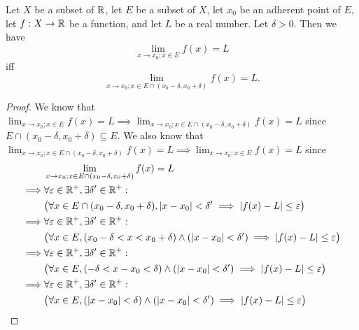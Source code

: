 \begin{prop}\label{i:9.3.18}
  Let \(X\) be a subset of \(\mathbb{R}\), let \(E\) be a subset of \(X\), let \(x_0\) be an adherent point of \(E\), let \(f : X \to \mathbb{R}\) be a function, and let \(L\) be a real number.
  Let \(\delta > 0\).
  Then we have
  \[
    \lim_{x \to x_0 ; x \in E} f(x) = L
  \]
  iff
  \[
    \lim_{x \to x_0 ; x \in E \cap (x_0 - \delta, x_0 + \delta)} f(x) = L.
  \]
\end{prop}

\begin{proof}
  We know that \(\lim_{x \to x_0 ; x \in E} f(x) = L \implies \lim_{x \to x_0 ; x \in E \cap (x_0 - \delta, x_0 + \delta)} f(x) = L\) since \(E \cap (x_0 - \delta, x_0 + \delta) \subseteq E\).
  We also know that \(\lim_{x \to x_0 ; x \in E \cap (x_0 - \delta, x_0 + \delta)} f(x) = L \implies \lim_{x \to x_0 ; x \in E} f(x) = L\) since
  \begin{align*}
             & \lim_{x \to x_0 ; x \in E \cap (x_0 - \delta, x_0 + \delta)} f(x) = L                                                                 \\
    \implies & \forall \varepsilon \in \R^+, \exists \delta' \in \R^+ :                                                                              \\
             & \big(\forall x \in E \cap (x_0 - \delta, x_0 + \delta), \abs{x - x_0} < \delta' \implies \abs{f(x) - L} \leq \varepsilon\big)         \\
    \implies & \forall \varepsilon \in \R^+, \exists \delta' \in \R^+ :                                                                              \\
             & \big(\forall x \in E, (x_0 - \delta < x < x_0 + \delta) \land (\abs{x - x_0} < \delta') \implies \abs{f(x) - L} \leq \varepsilon\big) \\
    \implies & \forall \varepsilon \in \R^+, \exists \delta' \in \R^+ :                                                                              \\
             & \big(\forall x \in E, (-\delta < x - x_0 < \delta) \land (\abs{x - x_0} < \delta') \implies \abs{f(x) - L} \leq \varepsilon\big)      \\
    \implies & \forall \varepsilon \in \R^+, \exists \delta' \in \R^+ :                                                                              \\
             & \big(\forall x \in E, (\abs{x - x_0} < \delta) \land (\abs{x - x_0} < \delta') \implies \abs{f(x) - L} \leq \varepsilon\big)          \\

\end{align*}
\end{proof}
